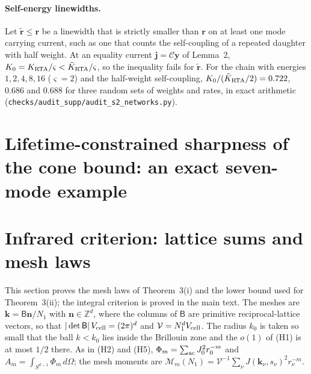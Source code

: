 \documentclass[aps,prb,10pt,onecolumn,amsmath,amssymb,superscriptaddress,nofootinbib]{revtex4-2}
\theoremstyle{plain}
\newcommand{\Cop}{\mathcal C}
\newcommand{\jj}{\mathbf j}
\newcommand{\yy}{\mathbf y}
\begin{document}
\paragraph*{Self-energy linewidths.}
Let $\tilde{\mathbf r}\le\mathbf r$ be a linewidth that is strictly smaller than $\mathbf r$ on at least one
mode carrying current, such as one that counts the self-coupling of a repeated daughter with half weight. At an
equality current $\jj=\Cop\yy$ of Lemma~2, $K_0=K_{\rm RTA}/\varsigma<\tilde K_{\rm RTA}/\varsigma$, so the
inequality fails for $\tilde{\mathbf r}$. For the chain with energies $1,2,4,8,16$ ($\varsigma=2$) and the
half-weight self-coupling, $K_0/(\tilde K_{\rm RTA}/2)=0.722$, $0.686$ and $0.688$ for three random sets of
weights and rates, in exact arithmetic (\texttt{checks/\allowbreak audit\_supp/\allowbreak audit\_s2\_networks.py}).

\section{Lifetime-constrained sharpness of the cone bound: an exact seven-mode example}

\section{Infrared criterion: lattice sums and mesh laws}

This section proves the mesh laws of Theorem~3(i) and the lower bound used for Theorem~3(ii); the
integral criterion is proved in the main text. The meshes are $\mathbf k=\mathsf B\mathbf n/N_1$ with
$\mathbf n\in\mathbb Z^d$, where the columns of $\mathsf B$ are primitive reciprocal-lattice vectors, so that
$|\det\mathsf B|\,V_{\rm cell}=(2\pi)^d$ and $\mathcal V=N_1^dV_{\rm cell}$. The radius $k_0$ is taken so
small that the ball $k<k_0$ lies inside the Brillouin zone and the $o(1)$ of (H1) is at most $1/2$ there.
As in (H2) and (H5), $\Phi_m=\sum_{\rm ac}J_0^2r_0^{-m}$ and $A_m=\int_{S^{d-1}}\Phi_m\,d\Omega$; the mesh
moments are $\mathcal M_m(N_1)=\mathcal V^{-1}\sum_\nu J(\mathbf k_\nu,s_\nu)^2r_\nu^{-m}$.
\end{document}
